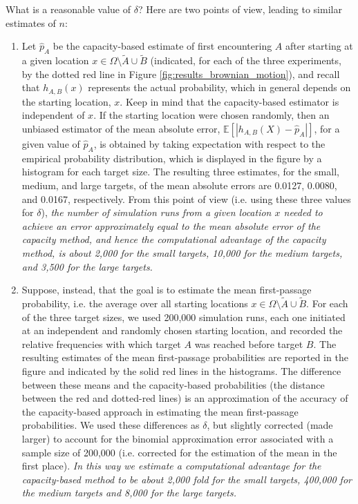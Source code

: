 \documentclass[12pt, nofootinbib,english, amsmath, amssymb, aps, priprint, graphicx,floatfix]{revtex4-1}
\theoremstyle{plain}
\theoremstyle{definition}
\theoremstyle{plain}
\newcommand{\tA}{{\tilde A}}
\newcommand{\tB}{{\tilde B}}
\begin{document}
{What is a reasonable value of $\delta$? Here are two points of view, leading to similar estimates of $n$:
\begin{enumerate}
\item 
Let $\hat{p}_A$ be the capacity-based estimate 
of first encountering $A$ after starting at a given location 
$x \in \Omega\setminus \tA \cup \tB$
(indicated, for each of the three experiments, by the dotted red line in Figure
\ref{fig:results_brownian_motion}), 
and recall that $h_{A,B}(x)$ 
represents the actual probability, which in general depends on the starting location, $x$.
Keep in mind that the capacity-based estimator is independent of $x$. If the starting location were chosen randomly, then an unbiased estimator of the mean absolute error,
$\mathbb{E}[| h_{A,B}(X) - \hat{p}_A |]$, 
for a given value of $\hat{p}_A$,
is obtained by taking expectation with respect to the empirical probability distribution, which is displayed in the figure by a histogram for each target size.
The resulting three estimates, for the small, medium, and large targets, of the mean absolute errors are 
0.0127,
0.0080,
and 0.0167, respectively. 
From this point of view (i.e. using these three values for $\delta$),
{\em 
the number of simulation runs from a given location $x$ needed to achieve an error approximately equal to the mean absolute error of the capacity method, and hence the computational advantage of the capacity method, is about 
2,000 for the small targets, 10,000 for the medium targets, and 
3,500 for the large targets.}
\item Suppose, instead, that the goal is to estimate the mean first-passage probability, i.e. the average over all starting locations 
$x \in \Omega\setminus \tA \cup \tB$. For each of the three target sizes, we used 200,000 simulation runs, each one initiated at an independent and randomly chosen starting location, and recorded the relative frequencies with which target $A$ was reached before target $B$. The resulting estimates of the mean first-passage probabilities are reported in the figure and indicated by the solid red lines in the histograms. The difference between these means and the capacity-based probabilities (the distance between the red and dotted-red lines) is an approximation of the accuracy of the capacity-based approach in estimating the mean first-passage probabilities. We used these differences as $\delta$, but slightly corrected (made larger) to account for the binomial approximation error associated with a  sample size of 200,000 (i.e. corrected for the estimation of the mean in the first place).
{\em In this way we estimate a computational advantage for the capacity-based method to be about 
2,000 fold for the small targets, 400,000 for the medium targets and  8,000 for the large targets.}
\end{enumerate}



}
\end{document}
